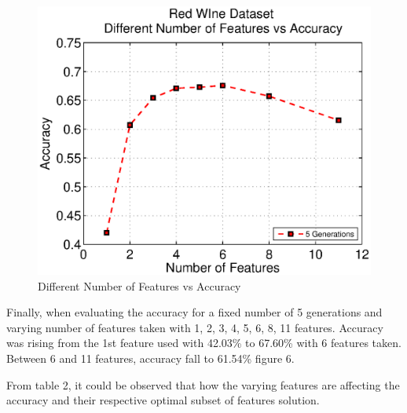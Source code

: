 \documentclass[11pt,onecolumn,a4paper]{article}
\begin{document}
      \begin{figure}[h!]
        \centering
        \includegraphics[width=0.6\linewidth]{img/winefeat2.eps}
       \caption{Different Number of Features vs Accuracy}
      \end{figure}
Finally, when evaluating the accuracy for a fixed number of 5 generations and varying number of features taken with 1, 2, 3, 4, 5, 6, 8, 11 features. Accuracy was rising from the 1st feature used with 42.03\% to 67.60\% with 6 features taken. Between 6 and 11 features, accuracy fall to 61.54\% figure 6.
   
   
   \begin{table}[h]
   \caption{Red Wine Varying Features}
   \end{table}
From table 2, it could be observed that how the varying features are affecting the accuracy and their respective optimal subset of features solution.
\end{document}
